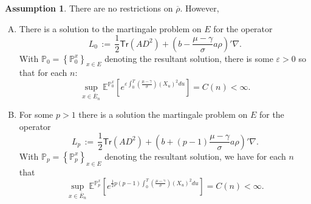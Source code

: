 \documentclass[11pt, letterpaper]{amsart}
\theoremstyle{definition}
\newtheorem{assumption}[theorem]{Assumption}
\theoremstyle{remark}
\numberwithin{equation}{section}
\newcommand{\eps}{\varepsilon}
\newcommand{\prob}{\mathbb{P}}
\newcommand{\esp}{\mathbb{E}}
\newcommand{\espalt}[2]{\esp^{#1}\bra{#2}}
\newcommand{\dfn}{\, := \,}
\newcommand{\bra}[1]{\left[#1\right]}
\newcommand{\cbra}[1]{\left\{#1\right\}}
\newcommand{\ol}[1]{\overline{#1}}
\newcommand{\tr}{\mathsf{Tr}}
\begin{document}
\begin{assumption}\label{A:opt_main_ass_com}
There are no restrictions on $\ol{\rho}$. However,
\begin{enumerate}[(A)]
\item There is a solution to the martingale problem on $E$ for the operator
\begin{equation*}
L_0 \dfn \frac{1}{2}\tr\left(AD^2\right) + \left(b-\frac{\mu-\gamma}{\sigma}a\rho\right)'\nabla.
\end{equation*}
With $\prob_0 = \cbra{\prob_0^{x}}_{x\in E}$ denoting the resultant solution, there is some $\eps > 0$ so that for each $n$:
\begin{equation*}
\sup_{x\in \ol{E}_n} \espalt{\prob_0^x}{e^{\eps\int_0^T \left(\frac{\mu-\gamma}{\sigma}\right)(X_u)^2 du}} = C(n) < \infty.
\end{equation*}
\item For some $p>1$ there is a solution the martingale problem on $E$ for the operator
\begin{equation*}
L_{p} \dfn \frac{1}{2}\tr\left(A D^2\right) + \left(b+(p-1)\frac{\mu-\gamma}{\sigma}a\rho\right)'\nabla.
\end{equation*}
With $\prob_{p} = \cbra{\prob_{p}^x}_{x\in E}$ denoting the resultant solution, we have for each $n$ that
\begin{equation*}
\sup_{x\in \ol{E}_n} \espalt{\prob_{p}^x}{e^{\frac{1}{2}p(p-1)\int_0^T \left(\frac{\mu-\gamma}{\sigma}\right)(X_u)^2 du}} = C(n) < \infty.
\end{equation*}
\end{enumerate}

\end{assumption}
\end{document}
